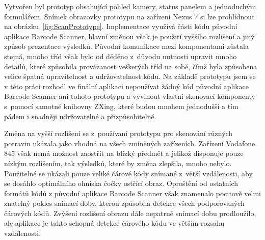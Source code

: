\documentclass[thesis=B,czech]{FITthesis}[2013/10/20]
\begin{document}
Vytvořen byl prototyp obsahující pohled kamery, status panelem a jednoduchým formulářem. Snímek obrazovky prototypu na zařízení Nexus 7 si lze prohlídnout na obrázku~\ref{fig:ScanPrototype}. Implementace využívá části kódu původní aplikace Barcode Scanner, hlavní změnou však je použití vyššího rozlišení a jiný způsob prezentace výsledků. Původní komunikace mezi komponentami zůstala stejná, mnoho tříd však bylo od děděno z~důvodu nutnosti upravit mnoho detailů, které způsobila provázanost veškerých tříd na sobě, čímž byla způsobena velice špatná upravitelnost a udržovatelnost kódu. Na základě prototypu jsem se v této práci rozhodl ve finální aplikaci nepoužívat žádný kód původní aplikace Barcode Scanner ani tohoto prototypu a vyvinout vlastní skenovací komponenty s~pomocí samotné knihovny ZXing, které budou mnohem jednodušší a tím pádem i snadněji udržovatelné a přizpůsobitelné.

Změna na vyšší rozlišení se z~používaní prototypu pro skenování různých potravin ukázala jako vhodná na všech zmíněných zařízeních. Zařízení Vodafone 845 však nemá možnost zaostřit na blízký předmět a jelikož disponuje pouze nízkým rozlišením, tak výsledků, které by změna zlepšila, mnoho nebylo. Použitelné se ukázali pouze veliké čárové kódy snímané z~větší vzdálenosti, aby se dosáhlo optimálního ohniska čočky ostřící obraz. Oproštění od ostatních formátů kódů z původní aplikace Barcode Scanner však znamenalo pocitově velmi znatelný pokles snímací doby, kterou způsobila detekce všech podporovaných čárových kódů. Zvýšení rozlišení obrazu dále nepatrně snímací dobu prodloužilo, ale aplikace je takto schopná detekce čárového kódu ve větším rozsahu vzdálenosti.
\end{document}
